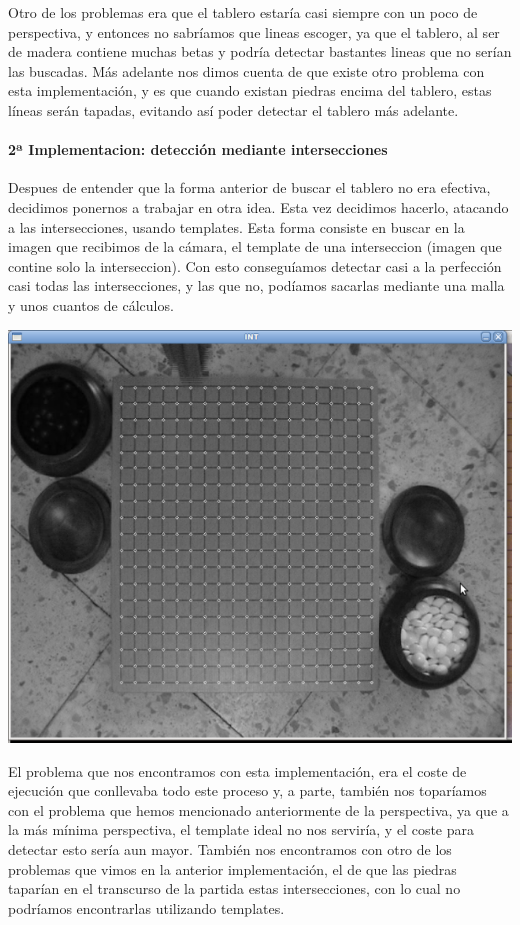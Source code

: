 \documentclass[12pt,a4paper]{report}
\begin{document}
Otro de los problemas era que el tablero estaría casi siempre con un poco de
perspectiva, y entonces no sabríamos que lineas escoger, ya que el tablero, al
ser de madera contiene muchas betas y podría detectar bastantes lineas que no
serían las buscadas. 
Más adelante nos dimos cuenta de que existe otro problema con esta
implementación, y es que cuando existan piedras encima del tablero, estas líneas
serán tapadas, evitando así poder detectar el tablero más adelante.
 

\paragraph{2ª Implementacion: detección mediante intersecciones}

Despues de entender que la forma anterior de buscar el tablero no era efectiva,
decidimos ponernos a trabajar en otra idea. Esta vez decidimos hacerlo, atacando
a las intersecciones, usando templates. Esta forma consiste en buscar en la
imagen que recibimos de la cámara, el template de una interseccion (imagen
que contine solo la interseccion). Con esto conseguíamos detectar casi a la
perfección casi todas las intersecciones, y las que no, podíamos sacarlas
mediante una malla y unos cuantos de cálculos.

\includegraphics[scale=0.6]{detec-intersecciones.png}

El problema que nos encontramos con esta implementación, era el coste de
ejecución que conllevaba todo este proceso y, a parte, también nos toparíamos
con el problema que hemos mencionado anteriormente de la perspectiva, ya que a
la más mínima perspectiva, el template ideal no nos serviría, y el coste para
detectar esto sería aun mayor. 
También nos encontramos con otro de los problemas que vimos en la anterior
implementación, el de que las piedras taparían en el transcurso de la partida
estas intersecciones, con lo cual no podríamos encontrarlas utilizando
templates.
\end{document}

